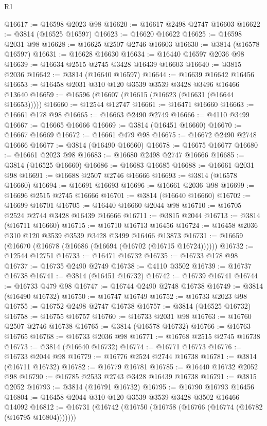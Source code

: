 \begin{lexlean}{R1}
\begin{coremodule}
@16617 := @16598 @2023 @98
@16620 := @16617 @2498 @2747 @16603
@16622 := @3814 (@16525 @16597)
@16623 := @16620 @16622
@16625 := @16598 @2031 @98
@16628 := @16625 @2507 @2746 @16603
@16630 := @3814 (@16578 @16597)
@16631 := @16628 @16630
@16634 := @16440 @16597 @2036 @98
@16639 := @16634 @2515 @2745 @3428 @16439 @16603
@16640 := @3815 @2036
@16642 := @3814 (@16640 @16597)
@16644 := @16639 @16642 @16456
@16653 := @16458 @2031 @310 @120 @3539 @3539 @3428 @3496 @16466 @13640
@16659 := @16596 (@16607 (@16615 (@16623 (@16631 (@16644 @16653)))))
@16660 := @12544 @12747
@16661 := @16471 @16660
@16663 := @16661 @178 @98
@16665 := @16663 @2490 @2749
@16666 := @4110 @3499
@16667 := @16665 @16666
@16669 := @3814 (@16451 @16660)
@16670 := @16667 @16669
@16672 := @16661 @479 @98
@16675 := @16672 @2490 @2748 @16666
@16677 := @3814 (@16490 @16660)
@16678 := @16675 @16677
@16680 := @16661 @2023 @98
@16683 := @16680 @2498 @2747 @16666
@16685 := @3814 (@16525 @16660)
@16686 := @16683 @16685
@16688 := @16661 @2031 @98
@16691 := @16688 @2507 @2746 @16666
@16693 := @3814 (@16578 @16660)
@16694 := @16691 @16693
@16696 := @16661 @2036 @98
@16699 := @16696 @2515 @2745 @16666
@16701 := @3814 (@16640 @16660)
@16702 := @16699 @16701
@16705 := @16440 @16660 @2044 @98
@16710 := @16705 @2524 @2744 @3428 @16439 @16666
@16711 := @3815 @2044
@16713 := @3814 (@16711 @16660)
@16715 := @16710 @16713 @16456
@16724 := @16458 @2036 @310 @120 @3539 @3539 @3428 @3499 @16466 @13873
@16731 := @16659 (@16670 (@16678 (@16686 (@16694 (@16702 (@16715 @16724))))))
@16732 := @12544 @12751
@16733 := @16471 @16732
@16735 := @16733 @178 @98
@16737 := @16735 @2490 @2749
@16738 := @4110 @3502
@16739 := @16737 @16738
@16741 := @3814 (@16451 @16732)
@16742 := @16739 @16741
@16744 := @16733 @479 @98
@16747 := @16744 @2490 @2748 @16738
@16749 := @3814 (@16490 @16732)
@16750 := @16747 @16749
@16752 := @16733 @2023 @98
@16755 := @16752 @2498 @2747 @16738
@16757 := @3814 (@16525 @16732)
@16758 := @16755 @16757
@16760 := @16733 @2031 @98
@16763 := @16760 @2507 @2746 @16738
@16765 := @3814 (@16578 @16732)
@16766 := @16763 @16765
@16768 := @16733 @2036 @98
@16771 := @16768 @2515 @2745 @16738
@16773 := @3814 (@16640 @16732)
@16774 := @16771 @16773
@16776 := @16733 @2044 @98
@16779 := @16776 @2524 @2744 @16738
@16781 := @3814 (@16711 @16732)
@16782 := @16779 @16781
@16785 := @16440 @16732 @2052 @98
@16790 := @16785 @2533 @2743 @3428 @16439 @16738
@16791 := @3815 @2052
@16793 := @3814 (@16791 @16732)
@16795 := @16790 @16793 @16456
@16804 := @16458 @2044 @310 @120 @3539 @3539 @3428 @3502 @16466 @14092
@16812 := @16731 (@16742 (@16750 (@16758 (@16766 (@16774 (@16782 (@16795 @16804)))))))

\end{coremodule}
\end{lexlean}
